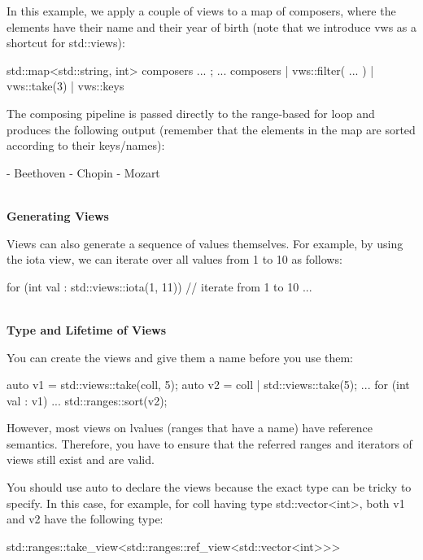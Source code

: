 In this example, we apply a couple of views to a map of composers, where the elements have their name and their year of birth (note that we introduce vws as a shortcut for std::views):

\begin{cpp}
std::map<std::string, int> composers{ ... };
...
composers
	| vws::filter( ... )
	| vws::take(3)
	| vws::keys
\end{cpp}

The composing pipeline is passed directly to the range-based for loop and produces the following output (remember that the elements in the map are sorted according to their keys/names):

\begin{shell}
- Beethoven
- Chopin
- Mozart
\end{shell}

\noindent
\hspace*{\fill} \\ %
\textbf{Generating Views}

Views can also generate a sequence of values themselves. For example, by using the iota view, we can iterate over all values from 1 to 10 as follows:

\begin{cpp}
for (int val : std::views::iota(1, 11)) { // iterate from 1 to 10
	...
}
\end{cpp}

\noindent
\hspace*{\fill} \\ %
\textbf{Type and Lifetime of Views}

You can create the views and give them a name before you use them:

\begin{cpp}
auto v1 = std::views::take(coll, 5);
auto v2 = coll | std::views::take(5);
...
for (int val : v1) {
	...
}
std::ranges::sort(v2);
\end{cpp}

However, most views on lvalues (ranges that have a name) have reference semantics. Therefore, you have to ensure that the referred ranges and iterators of views still exist and are valid.

You should use auto to declare the views because the exact type can be tricky to specify. In this case, for example, for coll having type std::vector<int>, both v1 and v2 have the following type:

\begin{cpp}
std::ranges::take_view<std::ranges::ref_view<std::vector<int>>>
\end{cpp}

